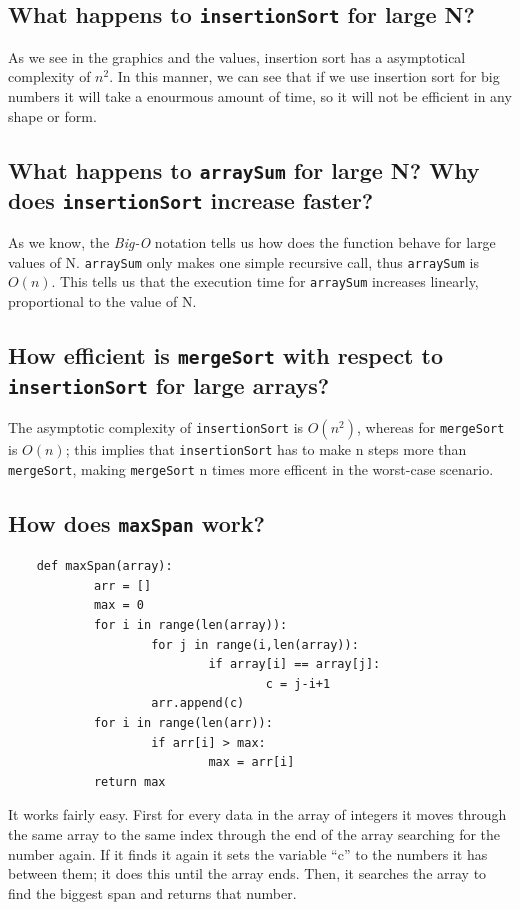 \documentclass[a4paper,12pt]{article}
\begin{document}
    \subsection{What happens to \texttt{insertionSort} for large N?}
    As we see in the graphics and the values, insertion sort has a asymptotical
complexity of $n^2$. In this manner, we can see that if we use insertion sort for
big numbers it will take a enourmous amount of time, so it will not be
efficient in any shape or form.

  \subsection{What happens to \texttt{arraySum} for large N? Why does \texttt{insertionSort} increase faster?}
    As we know, the \textit{Big-O} notation tells us how does the function behave for large values of N.
    \texttt{arraySum} only makes one simple recursive call, thus \texttt{arraySum} is $O(n)$. This tells us
    that the execution time for \texttt{arraySum} increases linearly, proportional to the value of N.

  \subsection{How efficient is \texttt{mergeSort} with respect to \texttt{insertionSort} for large arrays?}
    The asymptotic complexity of \texttt{insertionSort} is $O(n^2)$, whereas for \texttt{mergeSort} is $O(n)$; this implies that
    \texttt{insertionSort} has to make n steps more than \texttt{mergeSort}, making \texttt{mergeSort} n times more efficent in the worst-case scenario.

  \subsection{How does \texttt{maxSpan} work?}
  \begin{Verbatim}
    def maxSpan(array):
            arr = []
            max = 0
            for i in range(len(array)):
                    for j in range(i,len(array)):
                            if array[i] == array[j]:
                                    c = j-i+1
                    arr.append(c)
            for i in range(len(arr)):
                    if arr[i] > max:
                            max = arr[i]
            return max
  \end{Verbatim}
It works fairly easy. First for every data in the array of integers it moves
through the same array to the same index through the end of the array
searching for the number again. If it finds it again it sets the variable ``c''
to the numbers it has between them; it does this until the array ends. Then,
it searches the array to find the biggest span and returns that number.
\end{document}
